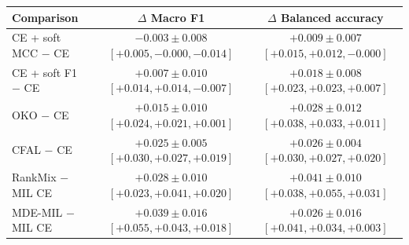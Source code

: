 \begin{tabular}{lcc}
\toprule
Comparison & $\Delta$ Macro F1 & $\Delta$ Balanced accuracy\\
\midrule
CE + soft MCC $-$ CE & $-0.003 \pm 0.008$ {\scriptsize $[+0.005, -0.000, -0.014]$} & $+0.009 \pm 0.007$ {\scriptsize $[+0.015, +0.012, -0.000]$}\\
CE + soft F1 $-$ CE & $+0.007 \pm 0.010$ {\scriptsize $[+0.014, +0.014, -0.007]$} & $+0.018 \pm 0.008$ {\scriptsize $[+0.023, +0.023, +0.007]$}\\
OKO $-$ CE & $+0.015 \pm 0.010$ {\scriptsize $[+0.024, +0.021, +0.001]$} & $+0.028 \pm 0.012$ {\scriptsize $[+0.038, +0.033, +0.011]$}\\
CFAL $-$ CE & $+0.025 \pm 0.005$ {\scriptsize $[+0.030, +0.027, +0.019]$} & $+0.026 \pm 0.004$ {\scriptsize $[+0.030, +0.027, +0.020]$}\\
RankMix $-$ MIL CE & $+0.028 \pm 0.010$ {\scriptsize $[+0.023, +0.041, +0.020]$} & $+0.041 \pm 0.010$ {\scriptsize $[+0.038, +0.055, +0.031]$}\\
MDE-MIL $-$ MIL CE & $+0.039 \pm 0.016$ {\scriptsize $[+0.055, +0.043, +0.018]$} & $+0.026 \pm 0.016$ {\scriptsize $[+0.041, +0.034, +0.003]$}\\
\bottomrule
\end{tabular}
